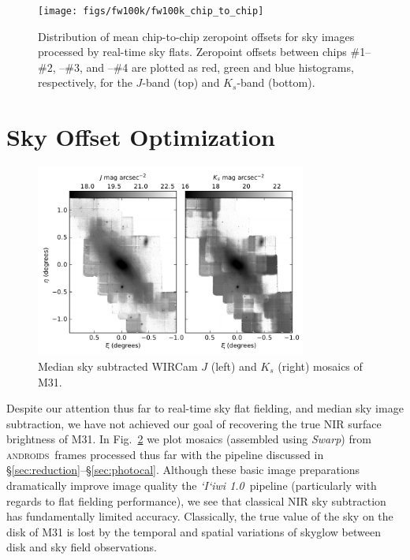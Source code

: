 \documentclass[iop]{emulateapj}
\newcommand{\sw}[1]{\textit{#1}} %
\newcommand{\iiwione}{\sw{`I`iwi 1.0}}
\newcommand{\androids}{\textsc{androids}}
\newcommand{\Fig}[1]{Fig.~\ref{fig:#1}}  %
\newcommand{\Sec}[1]{\S\ref{sec:#1}}  %
\begin{document}
\begin{figure}[t]
\centering
\texttt{[image: figs/fw100k/fw100k\_chip\_to\_chip]}
\caption{Distribution of mean chip-to-chip zeropoint offsets for sky images processed by real-time sky flats. Zeropoint offsets between chips \#1--\#2, --\#3, and --\#4 are plotted as
red, green and blue histograms, respectively, for the $J$-band (top) and $K_s$-band (bottom).}
\label{fig:fw100k_chip_to_chip}
\end{figure}

\section{Sky Offset Optimization}
\label{sec:scalar}

\begin{figure}[t]
\centering
\includegraphics[width=3.5in]{figs/raw_mosaics}
\caption{Median sky subtracted WIRCam $J$ (left) and $K_s$ (right) mosaics of M31.}
\label{fig:raw_mosaics}
\end{figure}

Despite our attention thus far to real-time sky flat fielding, and median sky image subtraction, we have not achieved our goal of recovering the true NIR surface brightness of M31.
In \Fig{raw_mosaics} we plot mosaics (assembled using \sw{Swarp}) from \androids\ frames processed thus far with the pipeline discussed in \Sec{reduction}--\Sec{photocal}.
Although these basic image preparations dramatically improve image quality the \iiwione\ pipeline (particularly with regards to flat fielding performance), we see that classical NIR sky subtraction has fundamentally limited accuracy.
Classically, the true value of the sky on the disk of M31 is lost by the temporal and spatial variations of skyglow between disk and sky field observations.
\end{document}
